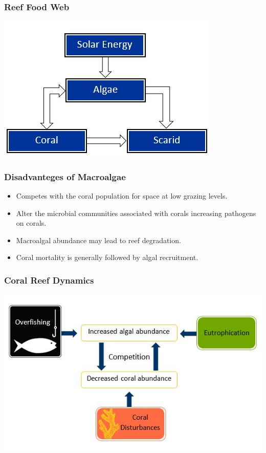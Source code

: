 \begin{frame}
\centering
\frametitle{Reef Food Web}
\includegraphics[scale=.65]{./CoralFoodWeb}
\end{frame}

\begin{frame}
\frametitle{Disadvanteges of Macroalgae}
\begin{itemize}
\item Competes with the coral population for space at low grazing levels.
\item Alter the microbial communities associated with corals increasing pathogens on corals.
\item Macroalgal abundance may lead to reef degradation.
\item Coral mortality is generally followed by algal recruitment.
\end{itemize}
\end{frame}

\begin{frame}
\frametitle{Coral Reef Dynamics}
\includegraphics[scale=.7]{./CoralDynamics}
\end{frame}


